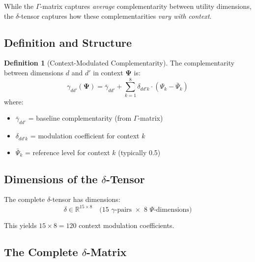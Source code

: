 \documentclass[11pt,a4paper]{article}
\theoremstyle{definition}
\newtheorem{definition}{Definition}[section]
\begin{document}
\label{sec:bbb-delta}

While the $\Gamma$-matrix captures \textit{average} complementarity between utility 
dimensions, the $\delta$-tensor captures how these complementarities \textit{vary 
with context}.

\subsection{Definition and Structure}

\begin{definition}[Context-Modulated Complementarity]
The complementarity between dimensions $d$ and $d'$ in context $\boldsymbol{\Psi}$ is:
\begin{equation}
\gamma_{dd'}(\boldsymbol{\Psi}) = \bar{\gamma}_{dd'} + \sum_{k=1}^{8} \delta_{dd'k} \cdot (\Psi_k - \bar{\Psi}_k)
\end{equation}
where:
\begin{itemize}
    \item $\bar{\gamma}_{dd'}$ = baseline complementarity (from $\Gamma$-matrix)
    \item $\delta_{dd'k}$ = modulation coefficient for context $k$
    \item $\bar{\Psi}_k$ = reference level for context $k$ (typically 0.5)
\end{itemize}
\end{definition}

\subsection{Dimensions of the $\delta$-Tensor}

The complete $\delta$-tensor has dimensions:
\begin{equation}
\delta \in \mathbb{R}^{15 \times 8} \quad \text{(15 $\gamma$-pairs $\times$ 8 $\Psi$-dimensions)}
\end{equation}

This yields $15 \times 8 = 120$ context modulation coefficients.

\subsection{The Complete $\delta$-Matrix}
\end{document}

